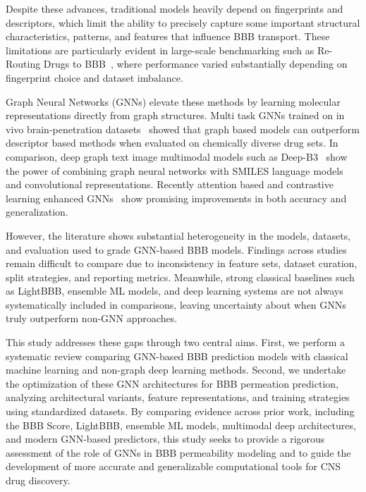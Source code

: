 \documentclass[conference]{IEEEtran}
\begin{document}
Despite these advances, traditional models heavily depend on
fingerprints and descriptors, which limit the ability to precisely
capture some important structural characteristics, patterns, and
features that influence BBB transport. These limitations are particularly evident in large-scale benchmarking such as Re-Routing Drugs to BBB~\cite{Ansari2022}, where performance varied substantially depending on fingerprint choice and dataset imbalance.

Graph Neural Networks (GNNs) elevate these methods by learning
molecular representations directly from graph structures. Multi task
GNNs trained on in vivo brain-penetration
datasets~\cite{Hamzic2022} showed that graph based models can
outperform descriptor based methods when evaluated on chemically
diverse drug sets. In comparison, deep graph text image multimodal
models such as Deep-B3~\cite{Tang2022} show the power of combining
graph neural networks with SMILES language models and convolutional
representations. Recently attention based and contrastive learning
enhanced GNNs~\cite{Koutroumpa2025} show promising improvements in
both accuracy and generalization.

However, the literature shows substantial heterogeneity in the models,
datasets, and evaluation used to grade GNN-based BBB models. Findings
across studies remain difficult to compare due to inconsistency in
feature sets, dataset curation, split strategies, and reporting
metrics. Meanwhile, strong classical baselines such as LightBBB,
ensemble ML models, and deep learning systems are not always
systematically included in comparisons, leaving uncertainty about when
GNNs truly outperform non-GNN approaches.

This study addresses these gaps through two central aims. First, we
perform a systematic review comparing GNN-based BBB prediction models
with classical machine learning and non-graph deep learning methods.
Second, we undertake the optimization of these GNN architectures for
BBB permeation prediction, analyzing architectural variants, feature
representations, and training strategies using standardized datasets.
By comparing evidence across prior work, including the BBB Score,
LightBBB, ensemble ML models, multimodal deep architectures, and
modern GNN-based predictors, this study seeks to provide a rigorous
assessment of the role of GNNs in BBB permeability modeling and to
guide the development of more accurate and generalizable computational
tools for CNS drug discovery.

\end{document}
